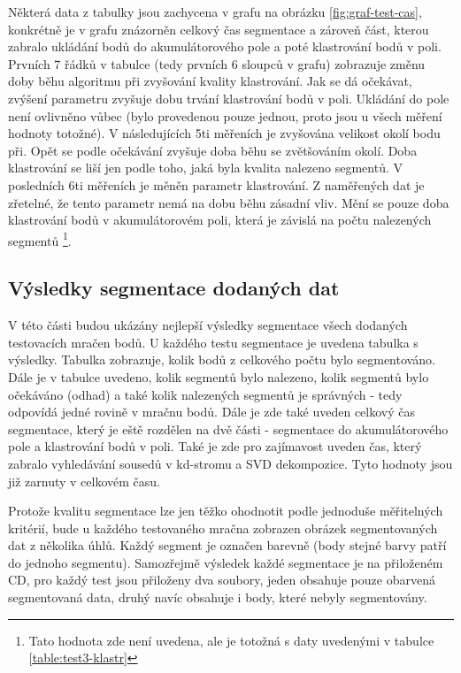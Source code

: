 \documentclass[11pt,twoside,a4paper]{book}
\begin{document}
Některá data z tabulky jsou zachycena v grafu na obrázku \ref{fig:graf-test-cas}, konkrétně je v grafu znázorněn celkový čas segmentace a zároveň část, kterou zabralo ukládání bodů do akumulátorového pole a poté klastrování bodů v poli. Prvních 7 řádků v tabulce (tedy prvních 6 sloupců v grafu) zobrazuje změnu doby běhu algoritmu při zvyšování kvality klastrování. Jak se dá očekávat, zvýšení parametru zvyšuje dobu trvání klastrování bodů v poli. Ukládání do pole není ovlivněno vůbec (bylo provedenou pouze jednou, proto jsou u všech měření hodnoty totožné). V následujících 5ti měřeních je zvyšována velikost okolí bodu při. Opět se podle očekávání zvyšuje doba běhu se zvětšováním okolí. Doba klastrování se liší jen podle toho, jaká byla kvalita nalezeno segmentů. V posledních 6ti měřeních je měněn parametr klastrování. Z naměřených dat je zřetelné, že tento parametr nemá na dobu běhu zásadní vliv. Mění se pouze doba klastrování bodů v akumulátorovém poli, která je závislá na počtu nalezených segmentů \footnote{Tato hodnota zde není uvedena, ale je totožná s daty uvedenými v tabulce \ref{table:test3-klastr}}.


\subsection{Výsledky segmentace dodaných dat}
V této části budou ukázány nejlepší výsledky segmentace všech dodaných testovacích mračen bodů. U každého testu segmentace je uvedena tabulka s výsledky. Tabulka zobrazuje, kolik bodů z celkového počtu bylo segmentováno. Dále je v tabulce uvedeno, kolik segmentů bylo nalezeno, kolik segmentů bylo očekáváno (odhad) a také kolik nalezených segmentů je správných - tedy odpovídá jedné rovině v mračnu bodů. Dále je zde také uveden celkový čas segmentace, který je eště rozdělen na dvě části - segmentace do akumulátorového pole a klastrování bodů v poli. Také je zde pro zajímavost uveden čas, který zabralo vyhledávání sousedů v kd-stromu a SVD dekompozice. Tyto hodnoty jsou již zarnuty v celkovém času.

Protože kvalitu segmentace lze jen těžko ohodnotit podle jednoduše měřitelných kritérií, bude u každého testovaného mračna zobrazen obrázek segmentovaných dat z několika úhlů. Každý segment je označen barevně (body stejné barvy patří do jednoho segmentu). Samozřejmě výsledek každé segmentace je na přiloženém CD, pro každý test jsou přiloženy dva soubory, jeden obsahuje pouze obarvená segmentovaná data, druhý navíc obsahuje i body, které nebyly segmentovány.
\end{document}
